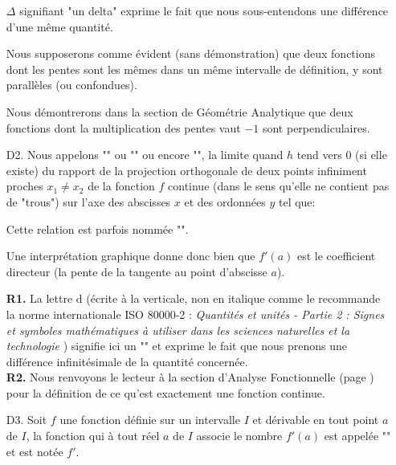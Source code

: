 \begin{enumerate}
		\begin{tcolorbox}[title=Remarque,colframe=black,arc=10pt]
	$\Delta$ signifiant "un delta" exprime le fait que nous sous-entendons une différence d'une même quantité.
		\end{tcolorbox}
		
		Nous supposerons comme évident (sans démonstration) que deux fonctions dont les pentes sont les mêmes dans un même intervalle de définition, y sont parallèles (ou confondues).
		
		\begin{tcolorbox}[title=Remarque,colframe=black,arc=10pt]
		Nous démontrerons dans la section de Géométrie Analytique que deux fonctions dont la multiplication des pentes vaut $-1$ sont perpendiculaires.
		\end{tcolorbox}
		
		\item[D2.] Nous appelons "" ou "" ou encore "", la limite quand $h$ tend vers $0$ (si elle existe) du rapport de la projection orthogonale de deux points infiniment proches $x_1\neq x_2$ de la fonction $f$ continue (dans le sens qu'elle ne contient pas de "trous") sur l'axe des abscisses $x$ et des ordonnées $y$ tel que:
		
		Cette relation est parfois nommée "".
		
		Une interprétation graphique donne donc bien que $f'(a)$ est le coefficient directeur (la pente de la tangente au point d'abscisse $a$).
		
		\begin{tcolorbox}[title=Remarques,colframe=black,arc=10pt]
		\textbf{R1.} La lettre $\mathrm{d}$ (écrite à la verticale, non en italique comme le recommande la norme internationale ISO 80000-2 : \textit{Quantités et unités - Partie 2 : Signes et symboles mathématiques à utiliser dans les sciences naturelles et la technologie} ) signifie ici un "" et exprime le fait que nous prenons une différence infinitésimale de la quantité concernée.\\
	
		\textbf{R2.} Nous renvoyons le lecteur à la section d'Analyse Fonctionnelle  (page \pageref{limits}) pour la définition de ce qu'est exactement une fonction continue.
		\end{tcolorbox}
		\item[D3.] Soit $f$ une fonction définie sur un intervalle $I$ et dérivable en tout point $a$ de $I$, la fonction qui à tout réel $a$ de $I$ associe le nombre $f'(a)$ est appelée "" et est notée $f'$.
		

\end{enumerate}
